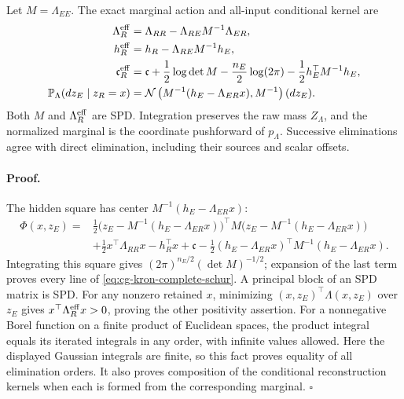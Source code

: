 Let \(M=\Lambda_{EE}\). The exact marginal action and all-input conditional
kernel are
\begin{equation}
\begin{aligned}
\Lambda_R^{\rm eff}
 &=\Lambda_{RR}-\Lambda_{RE}M^{-1}\Lambda_{ER},\\
h_R^{\rm eff}
 &=h_R-\Lambda_{RE}M^{-1}h_E,\\
\mathfrak c_R^{\rm eff}
 &=\mathfrak c+\frac12\log\det M-\frac{n_E}{2}\log(2\pi)
                     -\frac12h_E^\top M^{-1}h_E,\\
\mathbb P_\Lambda(dz_E\mid z_R=x)
 &=\mathcal N\left(M^{-1}(h_E-\Lambda_{ER}x),M^{-1}\right)(dz_E).
\end{aligned}
\label{eq:cg-kron-complete-schur}
\end{equation}
Both \(M\) and \(\Lambda_R^{\rm eff}\) are SPD. Integration preserves the
raw mass \(Z_\Lambda\), and the normalized marginal is the coordinate
pushforward of \(p_\Lambda\). Successive eliminations agree with direct
elimination, including their sources and scalar offsets.

\paragraph{Proof.}
The hidden square has center \(M^{-1}(h_E-\Lambda_{ER}x)\):
\begin{equation}
\begin{aligned}
\Phi(x,z_E)
={}&\frac12
\bigl(z_E-M^{-1}(h_E-\Lambda_{ER}x)\bigr)^\top
M\bigl(z_E-M^{-1}(h_E-\Lambda_{ER}x)\bigr)\\
&+\frac12x^\top\Lambda_{RR}x-h_R^\top x+\mathfrak c
-\frac12(h_E-\Lambda_{ER}x)^\top
M^{-1}(h_E-\Lambda_{ER}x).
\end{aligned}
\label{eq:cg-kron-completed-square}
\end{equation}
Integrating this square gives
\((2\pi)^{n_E/2}(\det M)^{-1/2}\); expansion of the last term proves every
line of \eqref{eq:cg-kron-complete-schur}. A principal block of an SPD
matrix is SPD. For any nonzero retained \(x\), minimizing
\((x,z_E)^\top\Lambda(x,z_E)\) over \(z_E\) gives
\(x^\top\Lambda_R^{\rm eff}x>0\), proving the other positivity assertion.
For a nonnegative Borel function on a finite product of Euclidean spaces,
the product integral equals its iterated integrals in any order, with
infinite values allowed. Here the displayed Gaussian integrals are finite,
so this fact proves equality of all elimination orders. It also proves
composition of the conditional reconstruction kernels when each is formed
from the corresponding marginal. \(\square\)

